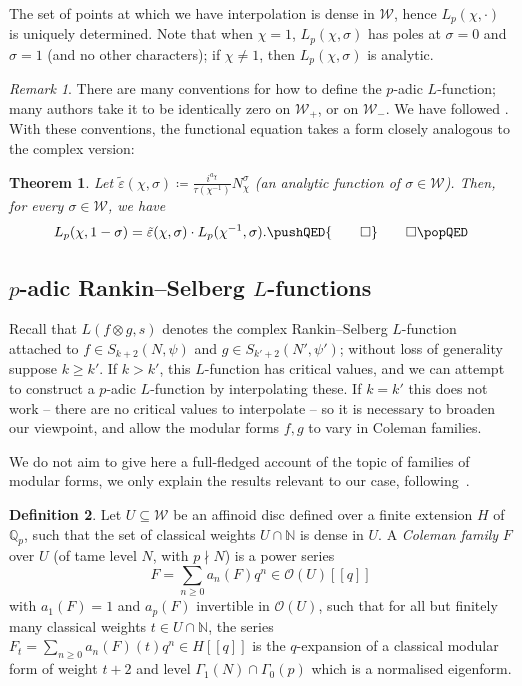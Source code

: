 \documentclass[11pt, a4paper, reqno]{amsart}
\theoremstyle{definition}
\newtheorem{definition}{Definition}[subsection]
\theoremstyle{plain}
\newtheorem{theorem}[definition]{Theorem}
\theoremstyle{remark}
\newtheorem*{remark}{Remark}
\newcommand{\numberset}{\mathbb}
\newcommand{\Q}{\numberset{Q}}
\newcommand{\N}{\numberset{N}}
\renewcommand{\epsilon}{\varepsilon}
\newcommand{\Weight}{\mathcal{W}}
\renewcommand{\ge}{\geqslant}
\renewcommand{\geq}{\ge}
\newcommand{\myqed}{\pushQED{\qed} \qedhere \popQED}
\begin{document}
  The set of points at which we have interpolation is dense in $\Weight$, hence $L_p(\chi,\cdot)$ is uniquely determined. Note that when $\chi = 1$, $L_p(\chi, \sigma)$ has poles at $\sigma = 0$ and $\sigma = 1$ (and no other characters); if $\chi \ne 1$, then $L_p(\chi, \sigma)$ is analytic.

  \begin{remark}
   There are many conventions for how to define the $p$-adic $L$-function; many authors take it to be identically zero on $\Weight_+$, or on $\Weight_-$. We have followed \cite{Dasgupta-factorization}. With these conventions, the functional equation takes a form closely analogous to the complex version:
  \end{remark}

  \begin{theorem}
   Let $\tilde{\epsilon}(\chi, \sigma) \coloneqq \tfrac{i^{a_\chi}}{\tau(\chi^{-1})} N_\chi^\sigma$ (an analytic function of $\sigma \in \Weight$). Then, for every $\sigma \in \Weight$, we have
   \[
    L_p(\chi,1-\sigma) = 
   \tilde{\epsilon}(\chi, \sigma) \cdot L_p(\chi^{-1},\sigma).\myqed
   \]
  \end{theorem}

\subsection{$p$-adic Rankin--Selberg $L$-functions}

 Recall that $L(f\otimes g,s)$ denotes the complex Rankin--Selberg $L$-function attached to $f \in S_{k+2}(N, \psi)$ and $g\in S_{k'+2}(N', \psi')$; without loss of generality suppose $k \geq k'$. If $k > k'$, this $L$-function has critical values, and we can attempt to construct a $p$-adic $L$-function by interpolating these. If $k = k'$ this does not work -- there are no critical values to interpolate -- so it is necessary to broaden our viewpoint, and allow the modular forms $f, g$ to vary in Coleman families.

  We do not aim to give here a full-fledged account of the topic of families of modular forms, we only explain the results relevant to our case, following~\cite{loefflerzerbes16}.

  \begin{definition}
   Let $U\subseteq \Weight$ be an affinoid disc defined over a finite extension $H$ of $\Q_p$, such that the set of classical weights $U \cap \N$ is dense in $U$. A \emph{Coleman family} $F$ over $U$ (of tame level $N$, with $p \nmid N$) is a power series
   \[
    F = \sum_{n\geq 0} a_n(F)q^n \in \mathcal{O}(U)[[q]]
   \]
   with $a_1(F)=1$ and $a_p(F)$ invertible in $\mathcal{O}(U)$, such that for all but finitely many classical weights $t \in U\cap \N$, the series $F_t = \sum_{n\geq 0} a_n(F)(t)q^n \in H[[q]]$ is the $q$-expansion of a classical modular form of weight $t+2$ and level $\Gamma_1(N)\cap\Gamma_0(p)$ which is a normalised eigenform.
  \end{definition}
\end{document}
